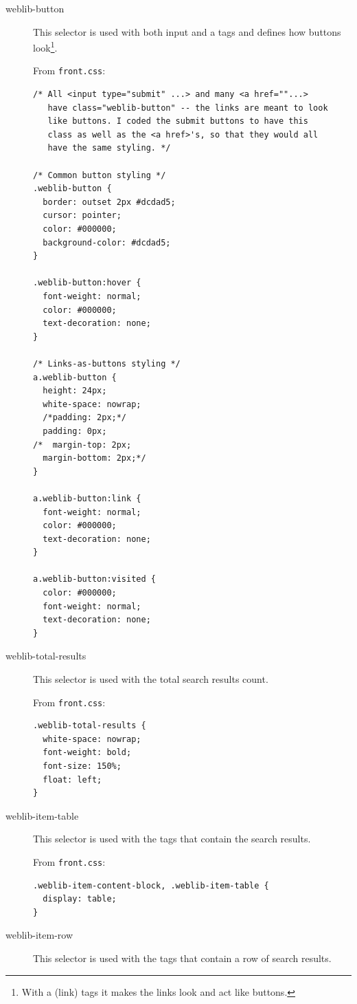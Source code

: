 \documentclass[letterpaper,twoside]{article}
\begin{document}
\begin{description}
\item[weblib-button] This selector is used with both input and a tags and 
defines how buttons look\footnote{With a (link) tags it makes the links look 
and act like buttons.}.

From \texttt{front.css}:

\begin{verbatim}
/* All <input type="submit" ...> and many <a href=""...> 
   have class="weblib-button" -- the links are meant to look 
   like buttons. I coded the submit buttons to have this 
   class as well as the <a href>'s, so that they would all 
   have the same styling. */

/* Common button styling */
.weblib-button {
  border: outset 2px #dcdad5;
  cursor: pointer;
  color: #000000;
  background-color: #dcdad5;
}

.weblib-button:hover {
  font-weight: normal;
  color: #000000;
  text-decoration: none;
}

/* Links-as-buttons styling */
a.weblib-button {
  height: 24px;
  white-space: nowrap;
  /*padding: 2px;*/
  padding: 0px;
/*  margin-top: 2px;
  margin-bottom: 2px;*/
}

a.weblib-button:link {
  font-weight: normal;
  color: #000000;
  text-decoration: none;
}

a.weblib-button:visited {
  color: #000000;
  font-weight: normal;
  text-decoration: none;
}
\end{verbatim}

\item[weblib-total-results] This selector is used with the total search 
results count.

From \texttt{front.css}:

\begin{verbatim}
.weblib-total-results {
  white-space: nowrap;
  font-weight: bold;
  font-size: 150%;
  float: left;
}
\end{verbatim}

\item[weblib-item-table] This selector is used with the tags that contain 
the search results.

From \texttt{front.css}:

\begin{verbatim}
.weblib-item-content-block, .weblib-item-table {
  display: table;
}
\end{verbatim}

\item[weblib-item-row] This selector is used with the tags that contain a 
row of search results.


\end{description}
\end{document}
